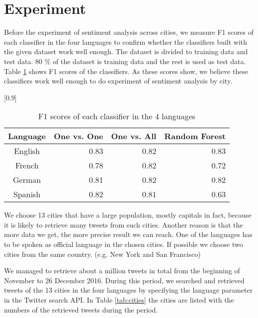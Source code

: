 \documentclass[twocolumn]{article}
\begin{document}
\vspace{-6mm}

\section{Experiment}
\vspace{-2mm}
Before the experiment of sentiment analysis across cities, we measure F1 scores of each classifier in the four languages to confirm whether the classifiers built with the given dataset work well enough.
The dataset is divided to training data and test data.
80 \% of the dataset is training data and the rest is used as test data.
Table \ref{tab:f1score} shows F1 scores of the classifiers.
As these scores show, we believe these classifiers work well enough to do experiment of sentiment analysis by city.

\begin{table}[ht]
	\caption{F1 scores of each classifier in the 4 languages}
	\scalebox{0.8}[0.9]{
	\begin{tabular}{|c|r|r|r|} \hline
	Language&One vs. One&One vs. All&Random Forest\\ \hline \hline
	English & 0.83 & 0.82 & 0.83  \\ \hline
	French & 0.78 & 0.82 & 0.72  \\ \hline
	German & 0.81 & 0.82 & 0.82 \\ \hline
	Spanish & 0.82 & 0.81 & 0.63  \\ \hline
	\end{tabular}
	}
	\label{tab:f1score}
\end{table}

We choose 13 cities that have a large population, mostly capitals in fact, because it is likely to retrieve many tweets from such cities.
Another reason is that the more data we get, the more precise result we can reach.
One of the languages has to be spoken as official language in the chosen cities.
If possible we choose two cities from the same country. (e.g. New York and San Francisco)

We managed to retrieve about a million tweets in total from the beginning of November to 26 December 2016.
During this period, we searched and retrieved tweets of the 13 cities in the four languages by specifying the language parameter in the Twitter search API.
In Table \ref{tab:cities} the cities are listed with the numbers of the retrieved tweets during the period.
\end{document}
